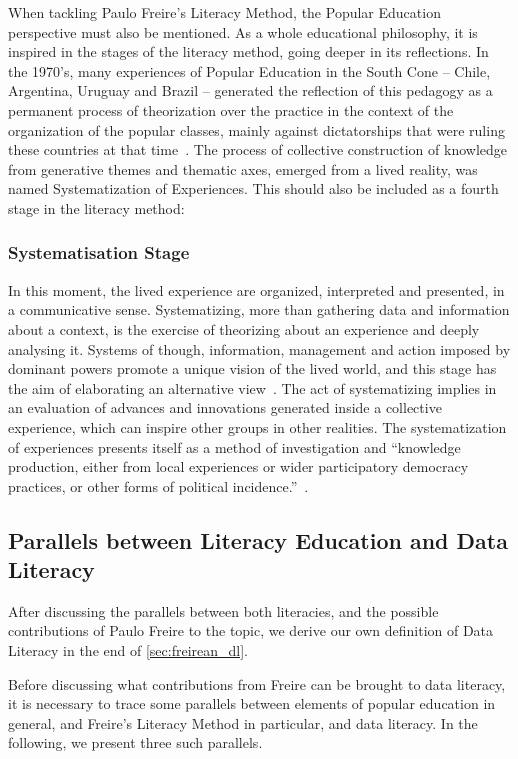 When tackling Paulo Freire's Literacy Method, the Popular Education perspective must also be mentioned. As a whole educational philosophy, it is inspired in the stages of the literacy method, going deeper in its reflections. In the 1970's, many experiences of Popular Education in the South Cone –  Chile, Argentina, Uruguay and Brazil – generated the reflection of this pedagogy as a permanent process of theorization over the practice in the context of the organization of the popular classes, mainly against dictatorships that were ruling these countries at that time~\cite{Jara1998}. The process of collective construction of knowledge from generative themes and thematic axes, emerged from a lived reality, was named Systematization of Experiences. This should also be included as a fourth stage in the literacy method:

\subsubsection{Systematisation Stage}
In this moment, the lived experience are organized, interpreted and presented, in a communicative sense. Systematizing, more than gathering data and information about a context, is the exercise of theorizing about an experience and deeply analysing it. Systems of though, information, management and action imposed by dominant powers promote a unique vision of the lived world, and this stage has the aim of elaborating an alternative view~\cite{Ghiso2011}. The act of systematizing implies in an evaluation of advances and innovations generated inside a collective experience, which can inspire other groups in other realities. The systematization of experiences presents itself as a method of investigation and “knowledge production, either from local experiences or wider participatory democracy practices, or other forms of political incidence.”~\cite{Adams2010}.

\subsection{Parallels between Literacy Education and Data Literacy}
After discussing the parallels between both literacies, and the possible contributions of Paulo Freire to the topic, we derive our own definition of Data Literacy in the end of \autoref{sec:freirean_dl}.

Before discussing what contributions from Freire can be brought to data literacy, it is necessary to trace some parallels between elements of popular education in general, and Freire's Literacy Method in particular, and data literacy. In the following, we present three such parallels. 

